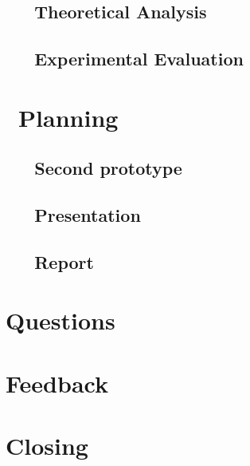 \documentclass[a4paper,twoside,11pt]{article}
\begin{document}
	\subsection{\ \ \ Theoretical Analysis}
	\subsection{\ \ \ Experimental Evaluation}
	
\section{\ Planning}
	\subsection{\ \ \ Second prototype }
	\subsection{\ \ \ Presentation }
	\subsection{\ \ \ Report }

\section{Questions}

\section{Feedback}

\section{Closing}
\end{document}
